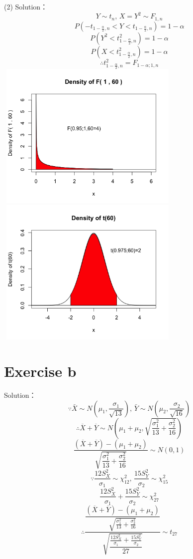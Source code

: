 \documentclass[a4papers]{ctexart}
\begin{document}
\noindent (2) Solution：
\[ Y\sim t_n,\, X=Y^2\sim F_{1,n} \]
\[ P(-t_{1-\frac{\alpha}{2},n}<Y<t_{1-\frac{\alpha}{2},n}) = 1-\alpha \]
\[ P(Y^2 < t^2_{1-\frac{\alpha}{2},n}) = 1-\alpha \]
\[ P(X < t^2_{1-\frac{\alpha}{2},n}) = 1-\alpha \]
\[ \therefore t^2_{1-\frac{\alpha}{2},n} = F_{1-\alpha;1,n}\]
\includegraphics[width=3.5in, height=2.8in]{f-1-60.png}
\includegraphics[width=3.5in, height=2.8in]{t-60.png}

\section*{Exercise b}
\noindent Solution：\\
\[ \because \bar{X} \sim N(\mu_1,\dfrac{\sigma_1}{\sqrt{13}}),\,
   \bar{Y} \sim N(\mu_2,\dfrac{\sigma_2}{\sqrt{16}})\]
\[ \therefore \overline {X}+\overline {Y}\sim N\left( \mu _{1}+\mu _{2},\sqrt {\dfrac {\sigma ^{2}_{1}}{13}+\dfrac {\sigma ^{2}_{2}}{16}}\right) \]
\[ \dfrac {\left( \overline {X}+\overline {Y}\right) -\left( \mu _{1}+\mu _{2}\right) }{\sqrt {\dfrac {\sigma ^{2}_{1}}{13}+\dfrac {\sigma ^{2}_{2}}{16}}}\sim N\left( 0,1\right) \]
\[ \because \dfrac{12 S_X^{2}}{\sigma_1}\sim \chi^2_{12},\,
    \dfrac{15 S_Y^{2}}{\sigma_2}\sim \chi^2_{15}\]
\[  \dfrac{12 S_X^{2}}{\sigma_1} + \dfrac{15 S_Y^{2}}{\sigma_2} \sim \chi^2_{27}\]
\[ \therefore \dfrac{ \dfrac {\left( \overline {X}+\overline {Y}\right) -\left( \mu _{1}+\mu _{2}\right) }{\sqrt {\frac {\sigma ^{2}_{1}}{13}+\frac {\sigma ^{2}_{2}}{16}}}}{ \sqrt{\dfrac{\frac{12 S_X^{2}}{\sigma_1} + \frac{15 S_Y^{2}}{\sigma_2}}{27}}} \sim t_{27} \]
\end{document}
